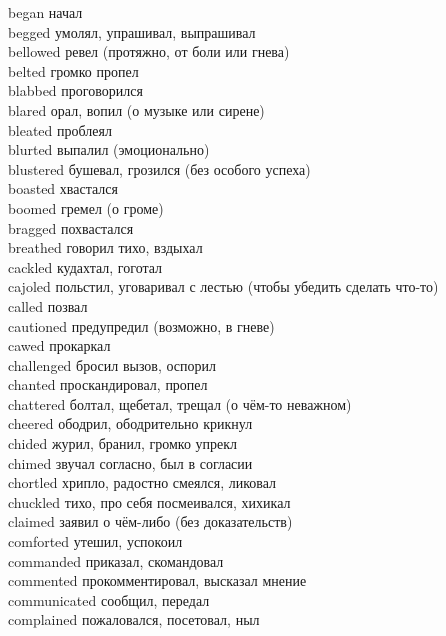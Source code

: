 began \hfill начал\\
begged \hfill умолял, упрашивал, выпрашивал\\
bellowed \hfill ревел (протяжно, от боли или гнева)\\
belted \hfill громко пропел\\
blabbed \hfill проговорился\\
blared \hfill орал, вопил (о музыке или сирене)\\
bleated \hfill проблеял\\
blurted \hfill выпалил (эмоционально)\\
blustered \hfill бушевал, грозился (без особого успеха)\\
boasted \hfill хвастался\\
boomed \hfill гремел (о громе)\\
bragged \hfill похвастался\\
breathed \hfill говорил тихо, вздыхал\\
cackled \hfill кудахтал, гоготал\\
cajoled \hfill польстил, уговаривал с лестью (чтобы убедить сделать что-то)\\
called \hfill позвал\\
cautioned \hfill предупредил (возможно, в гневе)\\
cawed \hfill прокаркал\\
challenged \hfill бросил вызов, оспорил\\
chanted \hfill проскандировал, пропел\\
chattered \hfill болтал, щебетал, трещал (о чём-то неважном)\\
cheered \hfill ободрил, ободрительно крикнул\\
chided \hfill журил, бранил, громко упрекл\\
chimed \hfill звучал согласно, был в согласии\\
chortled \hfill хрипло, радостно смеялся, ликовал\\
chuckled \hfill тихо, про себя посмеивался, хихикал\\
claimed \hfill заявил о чём-либо (без доказательств)\\
comforted \hfill утешил, успокоил\\
commanded \hfill приказал, скомандовал\\
commented \hfill прокомментировал, высказал мнение\\
communicated \hfill сообщил, передал\\
complained \hfill пожаловался, посетовал, ныл\\

